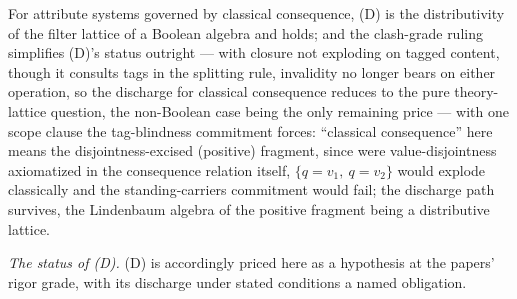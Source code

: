\noindent For attribute systems governed by classical consequence, (D) is the distributivity of the filter lattice of a Boolean algebra and holds; and the clash-grade ruling simplifies (D)'s status outright --- with closure not exploding on tagged content, though it consults tags in the splitting rule, invalidity no longer bears on either operation, so the discharge for classical consequence reduces to the pure theory-lattice question, the non-Boolean case being the only remaining price --- with one scope clause the tag-blindness commitment forces: ``classical consequence'' here means the disjointness-excised (positive) fragment, since were value-disjointness axiomatized in the consequence relation itself, $\{q = v_1,\ q = v_2\}$ would explode classically and the standing-carriers commitment would fail; the discharge path survives, the Lindenbaum algebra of the positive fragment being a distributive lattice.

\textit{The status of (D).} (D) is accordingly priced here as a hypothesis at the papers' rigor grade, with its discharge under stated conditions a named obligation.

